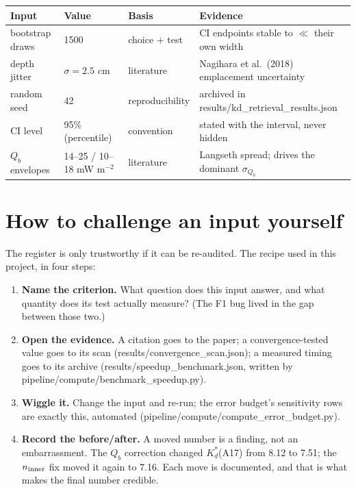 \documentclass[11pt]{report}
\newcommand{\code}[1]{{\ttfamily\small #1}}
\begin{document}
\begin{center}\footnotesize
\begin{tabular}{@{}llll@{}}
\toprule
Input & Value & Basis & Evidence \\
\midrule
bootstrap draws & 1500 & choice + test & CI endpoints stable to $\ll$ their own width \\
depth jitter & $\sigma = 2.5$ cm & literature & Nagihara et al.\ (2018) emplacement uncertainty \\
random seed & 42 & reproducibility & archived in \code{results/kd\_retrieval\_results.json} \\
CI level & 95\% (percentile) & convention & stated with the interval, never hidden \\
$Q_b$ envelopes & 14--25 / 10--18 mW m$^{-2}$ & literature & Langseth spread; drives the dominant $\sigma_{Q_b}$ \\
\bottomrule
\end{tabular}
\end{center}

\section{How to challenge an input yourself}\label{sec:challenge}

The register is only trustworthy if it can be re-audited. The recipe used in
this project, in four steps:

\begin{enumerate}[leftmargin=1.6em,itemsep=2pt]
\item \textbf{Name the criterion.} What question does this input answer, and
  what quantity does its test actually measure? (The F1 bug lived in the gap
  between those two.)
\item \textbf{Open the evidence.} A citation goes to the paper; a
  convergence-tested value goes to its scan
  (\code{results/convergence\_scan.json}); a measured timing goes to its
  archive (\code{results/speedup\_benchmark.json}, written by
  \code{pipeline/compute/benchmark\_speedup.py}).
\item \textbf{Wiggle it.} Change the input and re-run; the error budget's
  sensitivity rows are exactly this, automated
  (\code{pipeline/compute/compute\_error\_budget.py}).
\item \textbf{Record the before/after.} A moved number is a finding, not an
  embarrassment. The $Q_b$ correction changed $K_d^{*}$(A17) from 8.12 to 7.51;
  the $n_{\rm inner}$ fix moved it again to 7.16. Each move is documented, and
  that is what makes the final number credible.
\end{enumerate}
\end{document}
